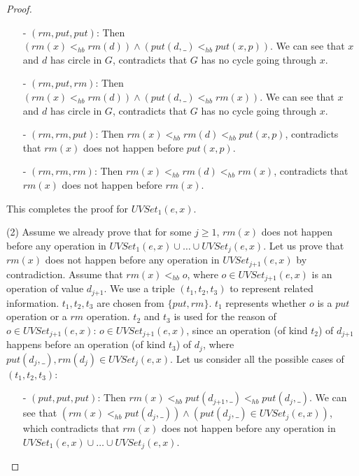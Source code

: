 \begin {proof}
\begin{itemize}
\item[-] $(\textit{rm},\textit{put},\textit{put})$: Then $( \textit{rm}(x) <_{hb} \textit{rm}(d) ) \wedge ( \textit{put}(d,\_) <_{hb} \textit{put}(x,p) )$. We can see that $x$ and $d$ has circle in $G$, contradicts that $G$ has no cycle going through $x$.

\item[-] $(\textit{rm},\textit{put},\textit{rm})$: Then $( \textit{rm}(x) <_{hb} \textit{rm}(d) ) \wedge ( \textit{put}(d,\_) <_{hb} \textit{rm}(x) )$. We can see that $x$ and $d$ has circle in $G$, contradicts that $G$ has no cycle going through $x$.

\item[-] $(\textit{rm},\textit{rm},\textit{put})$: Then $\textit{rm}(x) <_{hb} \textit{rm}(d) <_{hb} \textit{put}(x,p)$, contradicts that $\textit{rm}(x)$ does not happen before $\textit{put}(x,p)$.

\item[-] $(\textit{rm},\textit{rm},\textit{rm})$: Then $\textit{rm}(x) <_{hb} \textit{rm}(d) <_{hb} \textit{rm}(x)$, contradicts that $\textit{rm}(x)$ does not happen before $\textit{rm}(x)$.
\end{itemize}

This completes the proof for $\textit{UVSet}_1(e,x)$.

\noindent (2) Assume we already prove that for some $j \geq 1$, $\textit{rm}(x)$ does not happen before any operation in $\textit{UVSet}_1(e,x) \cup \ldots \cup \textit{UVSet}_j(e,x)$. Let us prove that $\textit{rm}(x)$ does not happen before any operation in $\textit{UVSet}_{\textit{j+1}}(e,x)$ by contradiction. Assume that $\textit{rm}(x) <_{hb} o$, where $o \in \textit{UVSet}_{\textit{j+1}}(e,x)$ is an operation of value $d_{\textit{j+1}}$. We use a triple $(t_1,t_2,t_3)$ to represent related information. $t_1,t_2,t_3$ are chosen from $\{ \textit{put},\textit{rm} \}$. $t_1$ represents whether $o$ is a $\textit{put}$ operation or a $\textit{rm}$ operation. $t_2$ and $t_3$ is used for the reason of $o \in \textit{UVSet}_{\textit{j+1}}(e,x)$: $o \in \textit{UVSet}_{\textit{j+1}}(e,x)$, since an operation (of kind $t_2$) of $d_{\textit{j+1}}$ happens before an operation (of kind $t_3$) of $d_j$, where $\textit{put}(d_j,\_), \textit{rm}(d_j) \in \textit{UVSet}_j(e,x)$. Let us consider all the possible cases of $(t_1,t_2,t_3)$:

\begin{itemize}
\setlength{\itemsep}{0.5pt}
\item[-] $(\textit{put},\textit{put},\textit{put})$: Then $\textit{rm}(x) <_{hb} \textit{put}(d_{\textit{j+1}},\_) <_{hb} \textit{put}(d_j,\_)$. We can see that $( \textit{rm}(x) <_{hb} \textit{put}(d_j,\_) ) \wedge ( \textit{put}(d_j,\_) \in \textit{UVSet}_j(e,x) )$, which contradicts that $\textit{rm}(x)$ does not happen before any operation in $\textit{UVSet}_1(e,x) \cup \ldots \cup \textit{UVSet}_j(e,x)$.


\end{itemize}
\end{proof}
